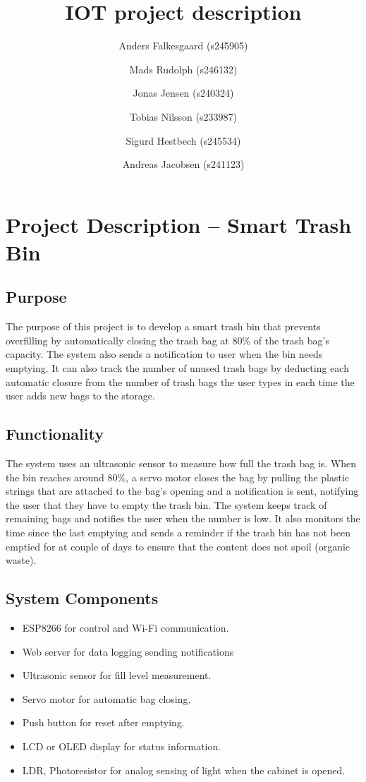 \title{IOT project description}
\author{
Anders Falkesgaard (s245905) \and
Mads Rudolph (s246132) \and
Jonas Jensen (s240324) \and
Tobias Nilsson (s233987) \and
Sigurd Hestbech (s245534) \and
Andreas Jacobsen (s241123)
}


\date{} %
\maketitle

\section{Project Description -- Smart Trash Bin}

\subsection{Purpose}
The purpose of this project is to develop a smart trash bin that prevents overfilling by automatically closing the trash bag at 80\% of the trash bag's capacity. The system also sends a notification to user when the bin needs emptying. It can also track the number of unused trash bags by deducting each automatic closure from the number of trash bags the user types in each time the user adds new bags to the storage.

\subsection{Functionality}
The system uses an ultrasonic sensor to measure how full the trash bag is. When the bin reaches around 80\%, a servo motor closes the bag by pulling the plastic strings that are attached to the bag's opening and a notification is sent, notifying the user that they have to empty the trash bin. The system keeps track of remaining bags and notifies the user when the number is low. It also monitors the time since the last emptying and sends a reminder if the trash bin has not been emptied for at couple of days to ensure that the content does not spoil (organic waste).

\subsection{System Components}
\begin{itemize}
    \item ESP8266 for control and Wi-Fi communication.
    \item Web server for data logging sending notifications
    \item Ultrasonic sensor for fill level measurement.
    \item Servo motor for automatic bag closing.
    \item Push button for reset after emptying.
    \item LCD or OLED display for status information.
    \item LDR, Photoresistor for analog sensing of light when the cabinet is opened.

    
\end{itemize}